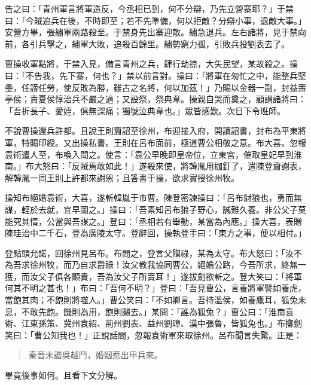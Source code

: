 告之曰：「青州軍言將軍造反，今丞相已到，何不分辯，乃先立營寨耶？」于禁曰：「今賊追兵在後，不時即至；若不先準備，何以拒敵？分辯小事，退敵大事。」安營方畢，張繡軍兩路殺至。于禁身先出寨迎敵。繡急退兵。左右諸將，見于禁向前，各引兵擊之，繡軍大敗，追殺百餘里。繡勢窮力孤，引敗兵投劉表去了。

曹操收軍點將，于禁入見，備言青州之兵，肆行劫掠，大失民望，某故殺之。操曰：「不告我，先下寨，何也？」禁以前言對。操曰：「將軍在匆忙之中，能整兵堅壘，任謗任勞，使反敗為勝，雖古之名將，何以加茲！」乃賜以金器一副，封益壽亭侯；責夏侯惇治兵不嚴之過；又設祭，祭典韋。操親自哭而奠之，顧謂諸將曰：「吾折長子、愛姪，俱無深痛；獨號泣典韋也。」眾皆感歎。次日下令班師。

不說曹操還兵許都。且說王則齎詔至徐州，布迎接入府，開讀詔書，封布為平東將軍，特賜印綬。又出操私書。王則在呂布面前，極道曹公相敬之意。布大喜。忽報袁術遣人至，布喚入問之。使言：「袁公早晚即皇帝位，立東宮，催取皇妃早到淮南。」布大怒曰：「反賊焉敢如此！」遂殺來使，將韓胤用枷釘了，遣陳登齎謝表，解韓胤一同王則上許都來謝恩；且答書于操，欲求實授徐州牧。

操知布絕婚袁術，大喜，遂斬韓胤于市曹。陳登密諫操曰：「呂布豺狼也，勇而無謀，輕於去就，宜早圖之。」操曰：「吾素知呂布狼子野心，誠難久養。非公父子莫能究其情，公當與吾謀之。」登曰：「丞相若有舉動，某當為內應。」操大喜，表贈陳珪治中二千石，登為廣陵太守。登辭回，操執登手曰：「東方之事，便以相付。」

登點頭允諾，回徐州見呂布。布問之，登言父贈祿，某為太守。布大怒曰：「汝不為吾求徐州牧，而乃自求爵祿！汝父教我協同曹公，絕婚公路，今吾所求，終無一獲，而汝父子俱各顯貴，吾為汝父子所賣耳！」遂拔劍欲斬之。登大笑曰：「將軍何其不明之甚也！」布曰：「吾何不明？」登曰：「吾見曹公，言養將軍譬如養虎，當飽其肉；不飽則將噬人。」曹公笑曰：「不如卿言。吾待溫侯，如養鷹耳，狐兔未息，不敢先飽。饑則為用，飽則颺去。」某問：「誰為狐兔？」曹公曰：「淮南袁術、江東孫策、冀州袁紹、荊州劉表、益州劉璋、漢中張魯，皆狐兔也。」布擲劍笑曰：「曹公知我也！」正說話間，忽報袁術軍來取徐州。呂布聞言失驚。正是：

\begin{quote}
秦晉未諧吳越鬥，婚姻惹出甲兵來。
\end{quote}

畢竟後事如何。且看下文分解。
